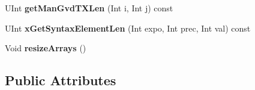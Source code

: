 \begin{DoxyCompactItemize}
\mbox{\label{class_s_e_i_alternative_depth_info_ad39f5bebf6359d80370a8372845ae4c4}} 
U\+Int {\bfseries get\+Man\+Gvd\+T\+X\+Len} (Int i, Int j) const
\item 
\mbox{\label{class_s_e_i_alternative_depth_info_ac1505cc70fa80e624c0919c5c1f4985f}} 
U\+Int {\bfseries x\+Get\+Syntax\+Element\+Len} (Int expo, Int prec, Int val) const
\item 
\mbox{\label{class_s_e_i_alternative_depth_info_a0f36c76ae35d34f0f36e6784f3490fe5}} 
Void {\bfseries resize\+Arrays} ()
\end{DoxyCompactItemize}
\subsection*{Public Attributes}
